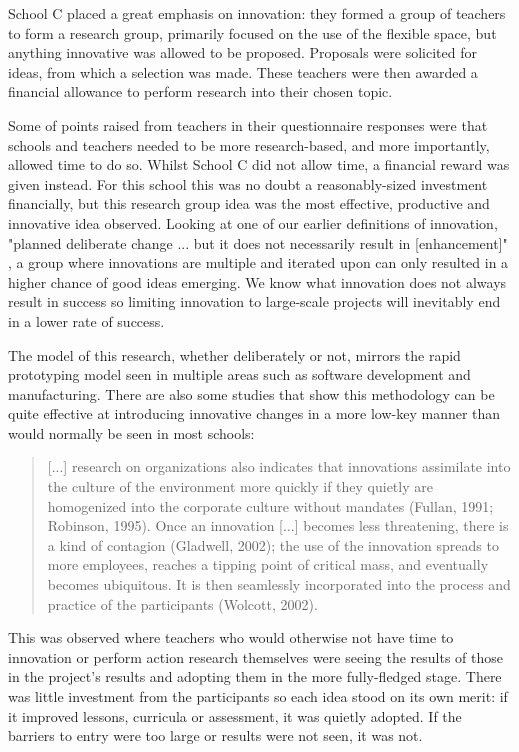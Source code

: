 School C placed a great emphasis on innovation: they formed a group of teachers to form a research group, primarily focused on the use of the flexible space, but anything innovative was allowed to be proposed. Proposals were solicited for ideas, from which a selection was made. These teachers were then awarded a financial allowance to perform research into their chosen topic. 

Some of points raised from teachers in their questionnaire responses were that schools and teachers needed to be more research-based, and more importantly, allowed time to do so. Whilst School C did not allow time, a financial reward was given instead. For this school this was no doubt a reasonably-sized investment financially, but this research group idea was the most effective, productive and innovative idea observed. Looking at one of our earlier definitions of innovation, "planned deliberate change ... but it does not necessarily result in [enhancement]" \cite{hannan2002}, a group where innovations are multiple and iterated upon can only resulted in a higher chance of good ideas emerging. We know what innovation does not always result in success so limiting innovation to large-scale projects will inevitably end in a lower rate of success.

The model of this research, whether deliberately or not, mirrors the rapid prototyping model seen in multiple areas such as software development and manufacturing. There are also some studies that show this methodology can be quite effective at introducing innovative changes in a more low-key manner than would normally be seen in most schools:

\begin{quote}
[...] research on organizations also indicates that innovations assimilate into the culture of the environment more quickly if they quietly are homogenized into the corporate culture without mandates (Fullan, 1991; Robinson, 1995). Once an innovation [...] becomes less threatening, there is a kind of contagion (Gladwell, 2002); the use of the innovation spreads to more employees, reaches a tipping point of critical mass, and eventually becomes ubiquitous. It is then seamlessly incorporated into the process and practice of
the participants (Wolcott, 2002).
\end{quote} \cite{cook2008combining}

This was observed where teachers who would otherwise not have time to innovation or perform action research themselves were seeing the results of those in the project's results and adopting them in the more fully-fledged stage. There was little investment from the participants so each idea stood on its own merit: if it improved lessons, curricula or assessment, it was quietly adopted. If the barriers to entry were too large or results were not seen, it was not.

